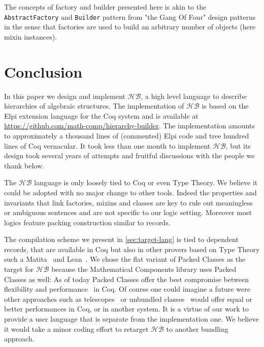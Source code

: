 \documentclass[a4paper,UKenglish,cleveref, autoref]{lipics-v2019}
\newcommand{\HB}{\ensuremath{\mathcal{HB}}}
\newcommand{\mixin}{mixin}
\newcommand{\mixins}{mixins}
\newcommand{\factory}{factory}
\newcommand{\factories}{factories}
\newcommand{\builder}{builder}
\newcommand{\classes}{classes}
\theoremstyle{implem}
\theoremstyle{implem}
\theoremstyle{command}
\theoremstyle{commands}
\begin{document}
{{The concepts of \factory{} and \builder{} presented here is akin to the
\verb-AbstractFactory- and \verb-Builder- pattern from "the Gang Of Four" design
patterns~\cite{gamma1995design} in the sense that \factories{} are used
to build an arbitrary number of objects (here \mixin{} instances).

\section{Conclusion}
In this paper we design and implement \HB{}, a high level language to describe
hierarchies of algebraic structures. The implementation of \HB{} is
based on the Elpi extension language for the Coq system and is available
at \url{https://github.com/math-comp/hierarchy-builder}.
The implementation amounts to approximately a thousand lines of (commented)
Elpi code and tree hundred lines of Coq vernacular. It took less than one month
to implement \HB{}, but its design took several years of attempts and fruitful
discussions with the people we thank below.

The \HB{} language is only loosely tied to Coq or even Type Theory.
We believe it could be adopted with no major change to other tools. Indeed the
properties and invariants that link \factories{}, \mixins{} and \classes{}
are key to rule out meaningless or ambiguous sentences and are not
specific to our logic setting. Moreover
most logics feature packing construction similar to records.

The compilation scheme we present in \autoref{sec:target-lang} is tied to dependent records,
that are available in Coq but also
in other provers based on Type Theory such a Matita~\cite{DBLP:conf/cade/AspertiRCT11}
and Lean~\cite{DBLP:conf/cade/MouraKADR15}.
We chose the flat variant of Packed Classes as the target for \HB{} because the
Mathematical Components library uses Packed Classes as well: As of today
Packed Classes offer the best compromise between flexibility and
performance~\cite[Section 8]{DBLP:conf/itp/MahboubiT13} in Coq.
Of course one could imagine a future were other approaches such as
telescopes~\cite{telescopes} or unbundled
classes~\cite{mathclasses} would offer equal or better performances in Coq, or in
another system.
It is a virtue of our work to provide a user language that is separate
from the implementation one. We believe it would take a minor coding effort to
retarget \HB{} to another bundling approach.

}}
\end{document}
